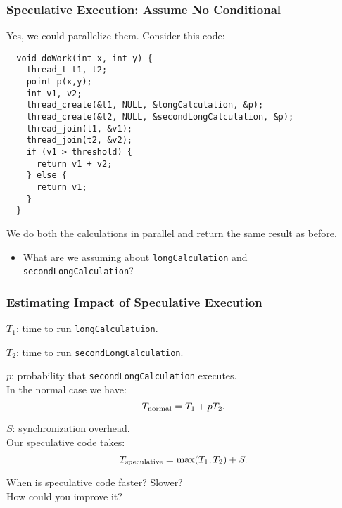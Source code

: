 \documentclass[aspectratio=43]{beamer}
\newenvironment{changemargin}[1]{%
  \begin{list}{}{%
    \setlength{\topsep}{0pt}%
    \setlength{\leftmargin}{#1}%
    \setlength{\rightmargin}{1em}
    \setlength{\listparindent}{\parindent}%
    \setlength{\itemindent}{\parindent}%
    \setlength{\parsep}{\parskip}%
  }%
  \item[]}{\end{list}}
\begin{document}
\begin{frame}[fragile]
  \frametitle{Speculative Execution: Assume No Conditional}

  \begin{changemargin}{1.5cm}
  Yes, we could parallelize them. Consider this code:
    
    \begin{lstlisting}
  void doWork(int x, int y) {
    thread_t t1, t2;
    point p(x,y);
    int v1, v2;
    thread_create(&t1, NULL, &longCalculation, &p);
    thread_create(&t2, NULL, &secondLongCalculation, &p);
    thread_join(t1, &v1);
    thread_join(t2, &v2);
    if (v1 > threshold) {
      return v1 + v2;
    } else {
      return v1;
    }
  }
    \end{lstlisting}

  We do both the calculations in parallel and return the same result as before.

  \begin{itemize}
    \item What are we assuming about {\tt longCalculation} and
{\tt secondLongCalculation}?
  \end{itemize}
  \end{changemargin}
\end{frame}

\begin{frame}
  \frametitle{Estimating Impact of Speculative Execution}

  \begin{changemargin}{2.5cm}
  $T_1$: time to run {\tt longCalculatuion}.

  $T_2$: time to run {\tt secondLongCalculation}.

  $p$: probability that {\tt secondLongCalculation} executes.\\[1em]

  In the normal case we have:
    \[T_{\mbox{\scriptsize normal}} = T_1 + pT_2.\]

  $S$: synchronization overhead.\\
  Our speculative code takes:
    \[ T_{\mbox{\scriptsize speculative}} = \mbox{max}(T_1, T_2) + S.\]

     When is speculative code faster? Slower? \\ How could you improve it?

  \end{changemargin}
\end{frame}
\end{document}
